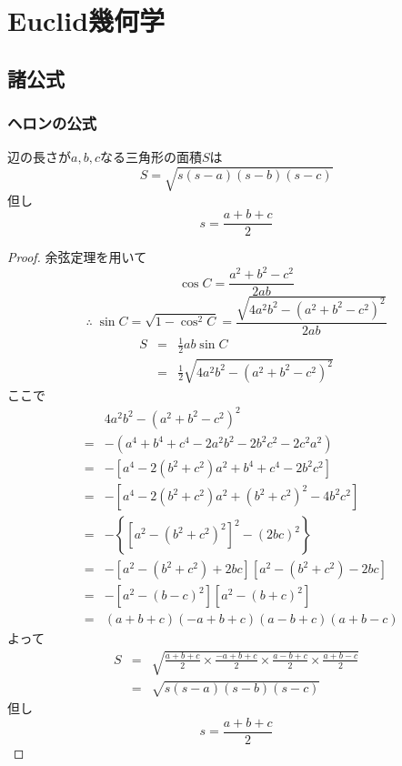 \chapter{Euclid幾何学}
    \section{諸公式}
        \subsection{ヘロンの公式}
            \begin{shadebox}
                辺の長さが$a,b,c$なる三角形の面積$S$は
                \[S = \sqrt{s(s-a)(s-b)(s-c)}\]
                但し
                \[s = \frac{a+b+c}{2}\]
            \end{shadebox}
            \begin{proof}
                余弦定理を用いて
                \[\cos{C} = \frac{a^2+b^2-c^2}{2ab}\]
                \[\therefore \; \sin{C} = \sqrt{1-\cos^2{C}} = \frac{\sqrt{4a^2b^2-{\left(a^2+b^2-c^2\right)}^2}}{2ab}\]
                \begin{align*}
                    S &=& \frac{1}{2}ab\sin{C}\\
                    &=& \frac{1}{2}\sqrt{4a^2b^2-{\left(a^2+b^2-c^2\right)}^2}
                \end{align*}
                ここで
                \begin{align*}
                    &\;& 4a^2b^2-{\left(a^2+b^2-c^2\right)}^2\\
                    &=& -\left(a^4+b^4+c^4-2a^2b^2-2b^2c^2-2c^2a^2\right)\\
                    &=& -\left[a^4 - 2(b^2+c^2)a^2 + b^4+c^4 -2b^2c^2\right]\\
                    &=& -\left[a^4 - 2(b^2+c^2)a^2 + (b^2+c^2)^2 -4b^2c^2\right]\\
                    &=& -\left\{\left[a^2-(b^2+c^2)^2\right]^2-(2bc)^2\right\}\\
                    &=& -\left[a^2-(b^2+c^2)+2bc\right]\left[a^2-(b^2+c^2)-2bc\right]\\
                    &=& -\left[a^2-(b-c)^2\right]\left[a^2-(b+c)^2\right]\\
                    &=& (a+b+c)(-a+b+c)(a-b+c)(a+b-c)
                \end{align*}
                よって
                \begin{align*}
                    S &=& \sqrt{\frac{a+b+c}{2}\times\frac{-a+b+c}{2}\times\frac{a-b+c}{2}\times\frac{a+b-c}{2}}\\
                    &=& \sqrt{s(s-a)(s-b)(s-c)}
                \end{align*}
                但し
                \[s = \frac{a+b+c}{2}\]
            \end{proof}
